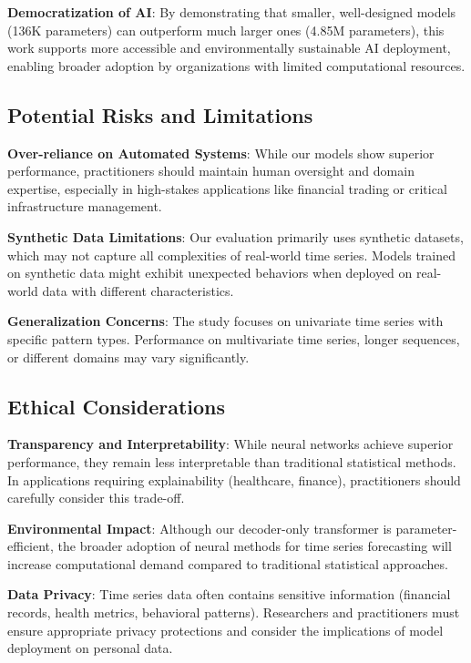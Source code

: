 \documentclass[11pt]{article}
\begin{document}
\textbf{Democratization of AI}: By demonstrating that smaller, well-designed models (136K parameters) can outperform much larger ones (4.85M parameters), this work supports more accessible and environmentally sustainable AI deployment, enabling broader adoption by organizations with limited computational resources.

\subsection*{Potential Risks and Limitations}

\textbf{Over-reliance on Automated Systems}: While our models show superior performance, practitioners should maintain human oversight and domain expertise, especially in high-stakes applications like financial trading or critical infrastructure management.

\textbf{Synthetic Data Limitations}: Our evaluation primarily uses synthetic datasets, which may not capture all complexities of real-world time series. Models trained on synthetic data might exhibit unexpected behaviors when deployed on real-world data with different characteristics.

\textbf{Generalization Concerns}: The study focuses on univariate time series with specific pattern types. Performance on multivariate time series, longer sequences, or different domains may vary significantly.

\subsection*{Ethical Considerations}

\textbf{Transparency and Interpretability}: While neural networks achieve superior performance, they remain less interpretable than traditional statistical methods. In applications requiring explainability (healthcare, finance), practitioners should carefully consider this trade-off.

\textbf{Environmental Impact}: Although our decoder-only transformer is parameter-efficient, the broader adoption of neural methods for time series forecasting will increase computational demand compared to traditional statistical approaches.

\textbf{Data Privacy}: Time series data often contains sensitive information (financial records, health metrics, behavioral patterns). Researchers and practitioners must ensure appropriate privacy protections and consider the implications of model deployment on personal data.
\end{document}
